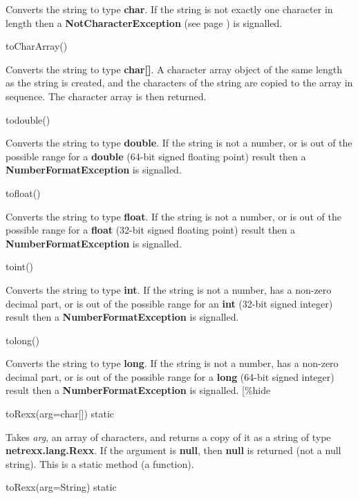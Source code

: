 \begin{description}
Converts the string to type \textbf{char}.  If the string is
not exactly one character in length then
a  \textbf{NotCharacterException} (see page \pageref{refexpnce})  is signalled.
\item{toCharArray()}

Converts the string to type \textbf{char[]}.  A character array object
of the same length as the string is created, and the characters of the
string are copied to the array in sequence.  The character array is then
returned.
\item{todouble()}

Converts the string to type \textbf{double}.  If the string is
not a number, or is out of the possible range for a \textbf{double}
(64-bit signed floating point) result then a \textbf{NumberFormatException}
is signalled.
\item{tofloat()}

Converts the string to type \textbf{float}.  If the string is
not a number, or is out of the possible range for a \textbf{float}
(32-bit signed floating point) result then a \textbf{NumberFormatException}
is signalled.
\item{toint()}

Converts the string to type \textbf{int}.  If the string is
not a number, has a non-zero decimal part, or is out of the possible
range for an \textbf{int} (32-bit signed integer) result then
a \textbf{NumberFormatException} is signalled.
\item{tolong()}

Converts the string to type \textbf{long}.  If the string is
not a number, has a non-zero decimal part, or is out of the possible
range for a \textbf{long} (64-bit signed integer) result then
a \textbf{NumberFormatException} is signalled.
[\%hide
\item{toRexx(arg=char[]) static}

Takes \emph{arg}, an array of characters, and returns a copy
of it as a string of type \textbf{netrexx.lang.Rexx}.
If the argument is \textbf{null}, then \textbf{null} is returned
(not a null string).
This is a static method (a function).
\item{toRexx(arg=String) static}


\end{description}
